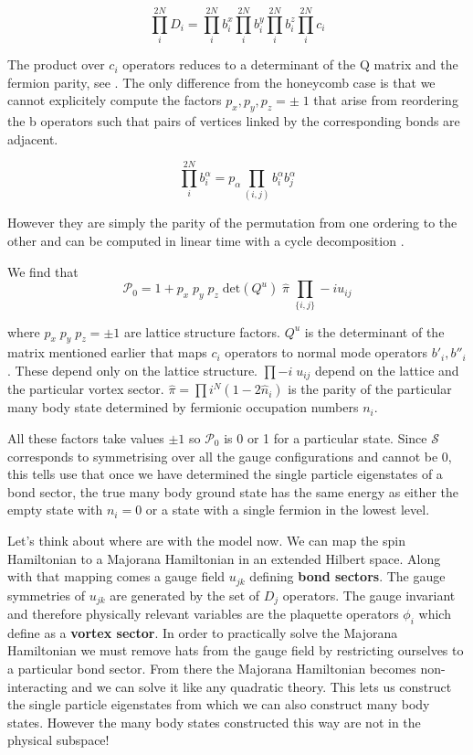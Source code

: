 \[\prod_i^{2N} D_i = \prod_i^{2N} b^x_i \prod_i^{2N} b^y_i \prod_i^{2N} b^z_i \prod_i^{2N} c_i\]

The product over \(c_i\) operators reduces to a determinant of the Q
matrix and the fermion parity, see
\textcite{pedrocchiPhysicalSolutionsKitaev2011b} . The only difference
from the honeycomb case is that we cannot explicitely compute the
factors \(p_x,p_y,p_z = \pm\;1\) that arise from reordering the b
operators such that pairs of vertices linked by the corresponding bonds
are adjacent.

\[\prod_i^{2N} b^\alpha_i = p_\alpha \prod_{(i,j)}b^\alpha_i b^\alpha_j\]

However they are simply the parity of the permutation from one ordering
to the other and can be computed in linear time with a cycle
decomposition \textcite{app:cycle_decomp}.

We find that
\[\mathcal{P}_0 = 1 + p_x\;p_y\;p_z\; \mathrm{det}(Q^u) \; \hat{\pi} \; \prod_{\{i,j\}} -iu_{ij}\]

where \(p_x\;p_y\;p_z = \pm 1\) are lattice structure factors. \(Q^u\)
is the determinant of the matrix mentioned earlier that maps \(c_i\)
operators to normal mode operators \(b'_i, b''_i\). These depend only on
the lattice structure. \(\prod -i \; u_{ij}\) depend on the lattice and
the particular vortex sector.
\(\hat{\pi} = \prod{i}^{N} (1 - 2\hat{n}_i)\) is the parity of the
particular many body state determined by fermionic occupation numbers
\(n_i\).

All these factors take values \(\pm 1\) so \(\mathcal{P}_0\) is 0 or 1
for a particular state. Since \(\mathcal{S}\) corresponds to
symmetrising over all the gauge configurations and cannot be 0, this
tells use that once we have determined the single particle eigenstates
of a bond sector, the true many body ground state has the same energy as
either the empty state with \(n_i = 0\) or a state with a single fermion
in the lowest level.

Let's think about where are with the model now. We can map the spin
Hamiltonian to a Majorana Hamiltonian in an extended Hilbert space.
Along with that mapping comes a gauge field \(u_{jk}\) defining
\textbf{bond sectors}. The gauge symmetries of \(u_{jk}\) are generated
by the set of \(D_j\) operators. The gauge invariant and therefore
physically relevant variables are the plaquette operators \(\phi_i\)
which define as a \textbf{vortex sector}. In order to practically solve
the Majorana Hamiltonian we must remove hats from the gauge field by
restricting ourselves to a particular bond sector. From there the
Majorana Hamiltonian becomes non-interacting and we can solve it like
any quadratic theory. This lets us construct the single particle
eigenstates from which we can also construct many body states. However
the many body states constructed this way are not in the physical
subspace!

